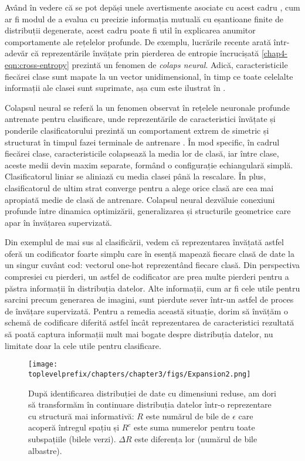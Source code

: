\documentclass[../../book-main_ro.tex]{subfiles}
\begin{document}
Având în vedere că se pot depăși unele avertismente asociate cu acest cadru \cite{kolchinsky2018caveats-ICLR2018}, cum ar fi modul de a evalua cu precizie informația mutuală cu eșantioane finite de distribuții degenerate, acest cadru poate fi util în explicarea anumitor comportamente ale rețelelor profunde.
De exemplu, lucrările recente \cite{papyan2020prevalence} arată într-adevăr că reprezentările învățate prin pierderea de entropie încrucișată \eqref{chap4-eqn:cross-entropy} prezintă un fenomen de \emph{colaps neural}.
Adică, caracteristicile fiecărei clase sunt mapate la un vector unidimensional, în timp ce toate celelalte informații ale clasei sunt suprimate, așa cum este ilustrat în .
\begin{remark}
    Colapsul neural se referă la un fenomen observat în rețelele neuronale profunde antrenate pentru clasificare, unde reprezentările de caracteristici învățate și ponderile clasificatorului prezintă un comportament extrem de simetric și structurat în timpul fazei terminale de antrenare \cite{papyan2020prevalence,zhu2021geometric}. În mod specific, în cadrul fiecărei clase, caracteristicile colapsează la media lor de clasă, iar între clase, aceste medii devin maxim separate, formând o configurație echiangulară simplă. Clasificatorul liniar se aliniază cu media clasei până la rescalare. În plus, clasificatorul de ultim strat converge pentru a alege orice clasă are cea mai apropiată medie de clasă de antrenare. Colapsul neural dezvăluie conexiuni profunde între dinamica optimizării, generalizarea și structurile geometrice care apar în învățarea supervizată.
\end{remark}

Din exemplul de mai sus al clasificării, vedem că reprezentarea învățată astfel oferă un codificator foarte simplu care în esență mapează fiecare clasă de date la un singur cuvânt cod: vectorul one-hot reprezentând fiecare clasă. Din perspectiva compresiei cu pierderi, un astfel de codificator are prea multe pierderi pentru a păstra informații în distribuția datelor. Alte informații, cum ar fi cele utile pentru sarcini precum generarea de imagini, sunt pierdute sever într-un astfel de proces de învățare supervizată. Pentru a remedia această situație, dorim să învățăm o schemă de codificare diferită astfel încât reprezentarea de caracteristici rezultată să poată captura informații mult mai bogate despre distribuția datelor, nu limitate doar la cele utile pentru clasificare.

\begin{figure}[ht]
	\centering
	\texttt{[image: \\toplevelprefix/chapters/chapter3/figs/Expansion2.png]}
	\caption{După identificarea distribuției de date cu dimensiuni reduse, am dori să transformăm în continuare distribuția datelor într-o reprezentare cu structură mai informativă: $R$ este numărul de bile de $\epsilon$ care acoperă întregul spațiu și $R^c$ este suma numerelor pentru toate subspațiile (bilele verzi). $\Delta R$ este diferența lor (numărul de bile albastre).}\label{fig:sphere-packing}
	\label{fig:informative-representation}
\end{figure}
\end{document}
